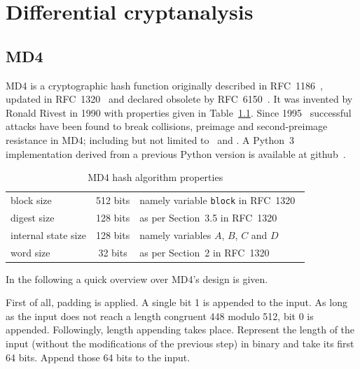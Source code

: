 \renewcommand*\chappic{img/diff-crypt.pdf}
\renewcommand*\chapquote{Just because it's automatic doesn't mean it works.}
\renewcommand*\chapquotesrc{Daniel J. Bernstein}
\chapter{Differential cryptanalysis}
\label{ch:dc}
%
\section{MD4}
\label{sec:dc-md4}
%
MD4 is a cryptographic hash function originally described in RFC~1186~\cite{rfc1186},
updated in RFC~1320~\cite{rfc1320} and declared obsolete by RFC~6150~\cite{rfc6150}. It was
invented by Ronald Rivest in 1990 with properties given in Table~\ref{tab:md4}.
Since 1995~\cite{Dobbertin1998} successful attacks have been found to break collisions,
preimage and second-preimage resistance in MD4; including but not limited to~\cite{md4-2007} and
\cite{cryptoeprint:2005:151}. A Python~3 implementation derived from a previous Python version
is available at github~\cite{md4-py3k}.

\begin{table}[h]
  \begin{center}
    \begin{tabular}{lcl}
      block size           & 512 bits       & namely variable \texttt{block} in RFC~1320~\cite{rfc1320} \\
      digest size          & 128 bits       & as per Section~3.5 in RFC~1320~\cite{rfc1320} \\
      internal state size  & 128 bits       & namely variables $A$, $B$, $C$ and $D$ \\
      word size            & 32 bits        & as per Section~2 in RFC~1320~\cite{rfc1320} \\
    \end{tabular}
    \caption{MD4 hash algorithm properties}
    \label{tab:md4}
  \end{center}
\end{table}

In the following a quick overview over MD4's design is given.

First of all, padding is applied. A single bit 1 is appended to the
input. As long as the input does not reach a length congruent 448 modulo 512,
bit 0 is appended.
Followingly, length appending takes place. Represent the length of the input
(without the modifications of the previous step) in binary and take its first
64 bits. Append those 64 bits to the input.


